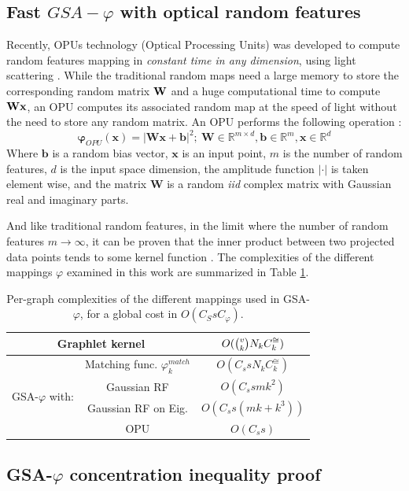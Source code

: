 \documentclass{article}
\begin{document}
\subsection{Fast $GSA-\varphi$ with optical random features}
\label{sec:OPU}
Recently, OPUs technology (Optical Processing Units) was developed to compute random features mapping in \emph{constant time in any dimension}, using light scattering \cite{saade_opu}. While the traditional random maps need a large memory to store the corresponding random matrix $\mathbf{W}$ and a huge computational time to compute $\mathbf{Wx}$, an OPU computes its associated random map at the speed of light without the need to store any random matrix. An OPU performs the following operation \cite{saade_opu}:
\[
\label{OPU_equation}
\mathbf{\varphi}_{OPU}(\mathbf{x})=|\mathbf{Wx+b}|^2 ;~\mathbf{W}\in \mathbb{R}^{m\times d},\mathbf{b}\in \mathbb{R}^m, \mathbf{x}\in \mathbb{R}^d
\]
Where $\mathbf{b}$ is a random bias vector, $\mathbf{x}$ is an input point, $m$ is the number of random features, $d$ is the input space dimension, the amplitude function $|\cdot|$ is taken element wise, and the matrix $\mathbf{W}$ is a random \emph{iid} complex matrix with Gaussian real and imaginary parts.

And like traditional random features, in the limit where the number of random features $m\xrightarrow{}\infty$, it can be proven that the inner product between two projected data points tends to some kernel function \cite{saade_opu}.
The complexities of the different mappings $\varphi$ examined in this work are summarized in Table \ref{tab:cost}.
\begin{table}
\centering
\begin{tabular}{|c|c|c|}
\hline
\multicolumn{2}{|c|}{Graphlet kernel} & $O(\tbinom{v}{k} N_k C^{\cong}_k)$\\ \hline \hline
%
\multirow{4}{*}{GSA-$\varphi$ with:} & Matching func. $\varphi^{match}_k$ & $O(C_s s N_k C^{\cong}_k)$ \\
& Gaussian RF & $O(C_s s m k^2)$ \\ 
& Gaussian RF on Eig.  & $O(C_s s (m k + k^3))$ \\ 
& OPU   & $O(C_s s)$ \\ \hline
\end{tabular}
\caption{Per-graph complexities of the different mappings used in GSA-$\varphi$, for a global cost in $O(C_S s C_ \varphi)$.}
\label{tab:cost}
\end{table}

\subsection{GSA-$\varphi$ concentration inequality proof}
\label{section:proof}
\end{document}
